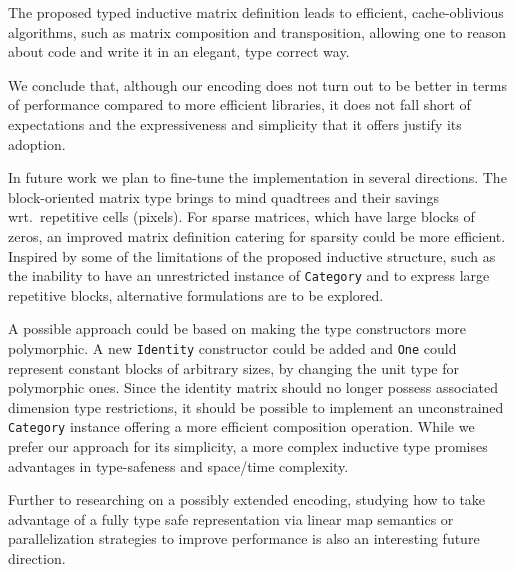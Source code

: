 \documentclass[sigplan,screen]{acmart}\settopmatter{}
\newcommand{\hs}{\texttt}
\begin{document}
The proposed typed inductive matrix definition leads to efficient, cache-oblivious algorithms, such as matrix composition and transposition, allowing one to reason about code and write it in an elegant, type correct way.

We conclude that, although our encoding does not turn out to be better in terms of performance compared to more efficient libraries, it does not fall short of expectations and the expressiveness and simplicity that it offers justify its adoption.

In future work we plan to fine-tune the implementation in several directions.
The block-oriented matrix type brings to mind quadtrees \cite{samet1984quadtree} and their savings wrt.\ repetitive cells (pixels). For sparse matrices, which have large blocks of zeros, an improved matrix definition catering for sparsity could be more efficient. Inspired by some of the limitations of the proposed inductive structure, such as the inability to have an unrestricted instance of \hs{Category} and to express large repetitive blocks, alternative formulations are to be explored. 

A possible approach could be based on making the type constructors more polymorphic.
A new \hs{Identity} constructor could be added and \hs{One} could represent constant blocks of arbitrary sizes, by changing the unit type for polymorphic ones. Since the identity matrix should no longer possess associated dimension type restrictions, it should be possible to implement an unconstrained \hs{Category} instance offering a more efficient composition operation.
While we prefer our approach for its simplicity, a more complex inductive type promises advantages in type-safeness and space/time complexity.

Further to researching on a possibly extended encoding, studying how to take advantage of a fully type safe representation via linear map semantics or parallelization strategies to improve performance is also an interesting future direction.
\end{document}
